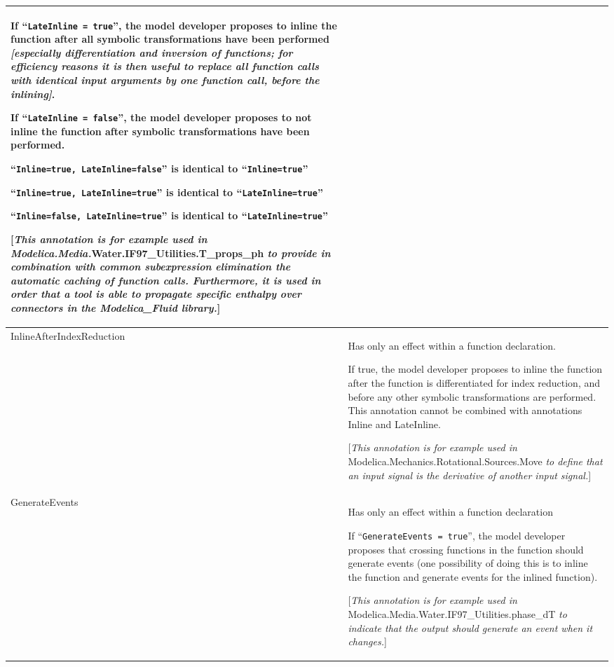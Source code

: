\begin{longtable}[]{|p{4.2cm}|p{10cm}|}
If ``\lstinline!LateInline = true!'', the model developer proposes to inline the
function after all symbolic transformations have been performed
\emph{{[}especially differentiation and inversion of functions; for
efficiency reasons it is then useful to replace all function calls with
identical input arguments by one function call, before the inlining{]}}.

If ``\lstinline!LateInline = false!'', the model developer proposes to not inline
the function after symbolic transformations have been performed.

``\lstinline!Inline=true, LateInline=false!'' is identical to ``\lstinline!Inline=true!''

``\lstinline!Inline=true, LateInline=true!'' is identical to ``\lstinline!LateInline=true!''

``\lstinline!Inline=false, LateInline=true!'' is identical to ``\lstinline!LateInline=true!''

{[}\emph{This annotation is for example used in
Modelica\allowbreak{}.Media\allowbreak{}.}Water\allowbreak{}.IF97\_Utilities\allowbreak{}.T\_props\_ph \emph{to provide in
combination with common subexpression elimination the automatic caching
of function calls. Furthermore, it is used in order that a tool is able
to propagate specific enthalpy over connectors in the Modelica\_Fluid
library.}{]}\\ \hline
InlineAfterIndexReduction\strut
&
Has only an effect within a function declaration.

If true, the model developer proposes to inline the function after the
function is differentiated for index reduction, and before any other
symbolic transformations are performed. This annotation cannot be
combined with annotations Inline and LateInline.

{[}\emph{This annotation is for example used in}
Modelica\allowbreak{}.Mechanics\allowbreak{}.Rotational\allowbreak{}.Sources\allowbreak{}.Move \emph{to define that an input
signal is the derivative of another input signal.}{]}\\ \hline
GenerateEvents\strut
&
Has only an effect within a function declaration

If ``\lstinline!GenerateEvents = true!'', the model developer proposes that crossing
functions in the function should generate events (one possibility of
doing this is to inline the function and generate events for the inlined
function).

{[}\emph{This annotation is for example used in}
Modelica\allowbreak{}.Media\allowbreak{}.Water\allowbreak{}.IF97\_Utilities.phase\_dT \emph{to indicate that
the output should generate an event when it changes.}{]}\\ \hline

\end{longtable}
